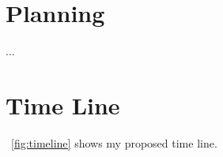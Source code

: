 \documentclass[a4paper]{aitthesis}
\begin{document}
\section{Planning}
...

\section{Time Line}
\figurename~\ref{fig:timeline} shows my proposed time line.



\FloatBarrier



\newpage\pagestyle{plain}
\theappendix
{}
%
\end{document}
